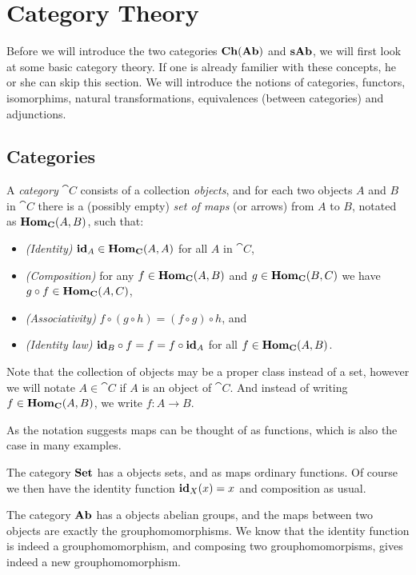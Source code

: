 \section{Category Theory}
\label{sec:Category Theory}
Before we will introduce the two categories $\mathbf{Ch}(\mathbf{Ab})$ and $\mathbf{sAb}$, we will first look at some basic category theory. If one is already familier with these concepts, he or she can skip this section. We will introduce the notions of categories, functors, isomorphims, natural transformations, equivalences (between categories) and adjunctions.

\subsection{Categories}
\begin{definition}
	A \emph{category} $\cat{C}$ consists of a collection \emph{objects}, and for each two objects $A$ and $B$ in $\cat{C}$ there is a (possibly empty) \emph{set of maps} (or arrows) from $A$ to $B$, notated as $\mathbf{Hom}_{\mathbf{C}}(A, B)$, such that:
	\begin{itemize}
		\item \emph{(Identity)}
			$\mathbf{id}_A \in \mathbf{Hom}_{\mathbf{C}}(A, A)$ for all $A$ in $\cat{C}$,
		\item \emph{(Composition)}
			for any $f \in \mathbf{Hom}_{\mathbf{C}}(A, B)$ and $g \in \mathbf{Hom}_{\mathbf{C}}(B, C)$ we have $g \circ f \in \mathbf{Hom}_{\mathbf{C}}(A, C)$,
		\item \emph{(Associativity)}
			$f \circ (g \circ h) = (f \circ g) \circ h$, and
		\item \emph{(Identity law)}
			$\mathbf{id}_B \circ f = f = f \circ \mathbf{id}_A$ for all $f \in \mathbf{Hom}_{\mathbf{C}}(A, B)$.
	\end{itemize}
\end{definition}

Note that the collection of objects may be a proper class instead of a set, however we will notate $A \in \cat{C}$ if $A$ is an object of $\cat{C}$. And instead of writing $f \in \mathbf{Hom}_{\mathbf{C}}(A, B)$, we write $f: A \to B$.

As the notation suggests maps can be thought of as functions, which is also the case in many examples.

\begin{lemma}
	The category $\mathbf{Set}$ has a objects sets, and as maps ordinary functions. Of course we then have the identity function $\mathbf{id}_X(x) = x$ and composition as usual.
\end{lemma}
\begin{lemma}
	The category $\mathbf{Ab}$ has a objects abelian groups, and the maps between two objects are exactly the grouphomomorphisms. We know that the identity function is indeed a grouphomomorphism, and composing two grouphomomorpisms, gives indeed a new grouphomomorphism.
\end{lemma}

